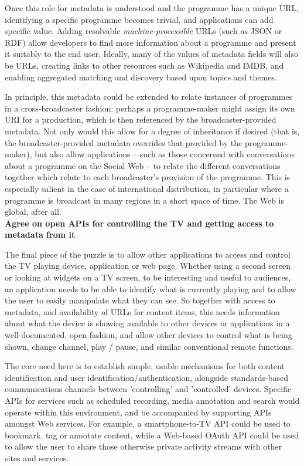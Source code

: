 \documentclass[]{article}%
\begin{document}
Once this role for metadata is understood and the programme has a unique URL, identifying a specific programme becomes trivial, and applications can add specific value. Adding resolvable {\em{machine-processible}} URLs (such as JSON or RDF) allow developers to find more information about a programme and present it suitably to the end user. Ideally, many of the values of metadata fields will also be URLs, creating links to other resources such as Wikipedia and IMDB, and enabling aggregated matching and discovery based upon topics and themes.

In principle, this metadata could be extended to relate instances of programmes in a cross-broadcaster fashion: perhaps a programme-maker might assign its own URI for a production, which is then referenced by the broadcaster-provided metadata. Not only would this allow for a degree of inheritance if desired (that is, the broadcaster-provided metadata overrides that provided by the programme-maker), but also allow applications -- such as those concerned with conversations about a programme on the Social Web -- to relate the different conversations together which relate to each broadcaster's provision of the programme.  This is especially salient in the case of international distribution, in particular where a programme is broadcast in many regions in a short space of time. The Web is global, after all.
\\

{\bf{Agree on open APIs for controlling the TV and getting access to metadata from it}}

The final piece of the puzzle is to allow other applications to access and control the TV playing device, application or web page. Whether using a second screen or looking at widgets on a TV screen, to be interesting and useful to audiences, an application needs to be able to identify what is currently playing and to allow the user to easily manipulate what they can see. So together with access to metadata, and availability of URLs for content items, this needs information about what the device is showing available to other devices or applications in a well-documented, open fashion, and allow other devices to control what is being shown, change channel, play / pause, and similar conventional remote functions.

The core need here is to establish simple, usable mechanisms for both content identification and user identification/authentication, alongside standards-based communications channels between 'controlling' and 'controlled' devices. Specific APIs for services such as scheduled recording, media annotation and search would operate within this environment, and be accompanied by supporting APIs amongst Web services. For example, a smartphone-to-TV API could be used to bookmark, tag or annotate content, while a Web-based OAuth API could be used to allow the user to share those otherwise private activity streams with other sites and services.
\end{document}
